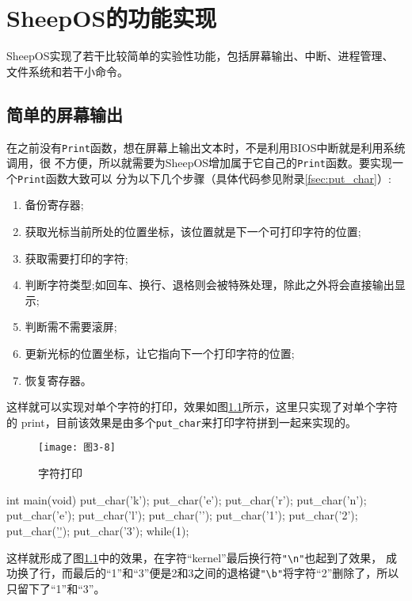 \chapter{SheepOS的功能实现}

SheepOS实现了若干比较简单的实验性功能，包括屏幕输出、中断、进程管理、
文件系统和若干小命令。

\section{简单的屏幕输出}

在之前没有\texttt{Print}函数，想在屏幕上输出文本时，不是利用BIOS中断就是利用系统调用，很
不方便，所以就需要为SheepOS增加属于它自己的\texttt{Print}函数。要实现一个\texttt{Print}函数大致可以
分为以下几个步骤（具体代码参见附录\ref{fsec:put_char}）:

\begin{enumerate}
\item 备份寄存器;
\item 获取光标当前所处的位置坐标，该位置就是下一个可打印字符的位置;
\item 获取需要打印的字符;
\item 判断字符类型;如回车、换行、退格则会被特殊处理，除此之外将会直接输出显示;
\item 判断需不需要滚屏;
\item 更新光标的位置坐标，让它指向下一个打印字符的位置;
\item 恢复寄存器。
\end{enumerate}
这样就可以实现对单个字符的打印，效果如图\ref{fig:print_char}所示，这里只实现了对单个字符的
print，目前该效果是由多个\texttt{put\_char}来打印字符拼到一起来实现的。

\begin{figure}[H]
  \centering
  \texttt{[image: 图3-8]}
  \caption{字符打印}
  \label{fig:print_char}
\end{figure}

\begin{codeblock}
\begin{ccode}
int main(void)
{
    put_char('k');
    put_char('e');
    put_char('r');
    put_char('n');
    put_char('e');
    put_char('l');
    put_char('\n');
    put_char('1');
    put_char('2');
    put_char('\b');
    put_char('3');
    while(1);
}
\end{ccode}
\end{codeblock}

这样就形成了图\ref{fig:print_char}中的效果，在字符“kernel”最后换行符\verb|"\n"|也起到了效果，
成功换了行，而最后的“1”和“3”便是2和3之间的退格键\verb|"\b"|将字符“2”删除了，所以只留下了“1”和“3”。

